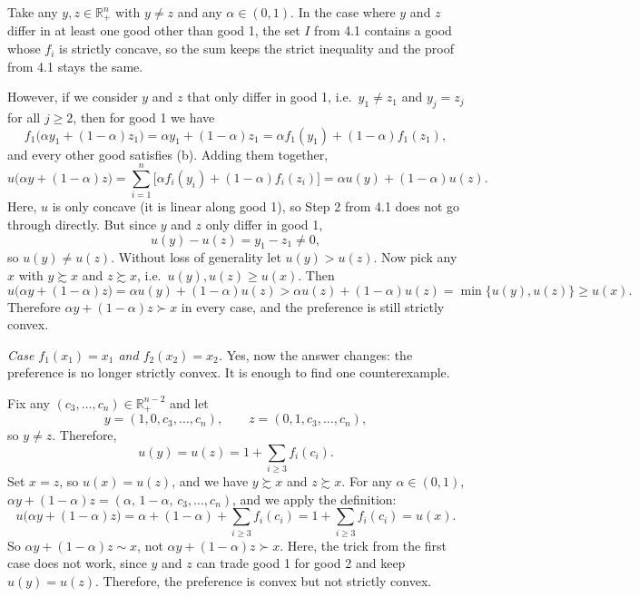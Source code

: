 \documentclass[12pt,letterpaper]{article}
\begin{document}
Take any $y,z\in\mathbb{R}^n_+$ with $y\neq z$ and any $\alpha\in(0,1)$. In the case where $y$ and $z$ differ in at least one good other than good 1, the set $I$ from 4.1 contains a good whose $f_i$ is strictly concave, so the sum keeps the strict inequality and the proof from 4.1 stays the same.

However, if we consider $y$ and $z$ that only differ in good 1, i.e.\ $y_1\neq z_1$ and $y_j=z_j$ for all $j\ge 2$, then for good 1 we have
\[
f_1\big(\alpha y_1+(1-\alpha)z_1\big) = \alpha y_1+(1-\alpha)z_1 = \alpha f_1(y_1)+(1-\alpha)f_1(z_1),
\]
and every other good satisfies (b). Adding them together,
\[
u\big(\alpha y+(1-\alpha)z\big) = \sum_{i=1}^n \Big[\alpha f_i(y_i)+(1-\alpha)f_i(z_i)\Big] = \alpha u(y)+(1-\alpha)u(z).
\]
Here, $u$ is only concave (it is linear along good 1), so Step 2 from 4.1 does not go through directly. But since $y$ and $z$ only differ in good 1,
\[
u(y)-u(z) = y_1-z_1 \neq 0,
\]
so $u(y)\neq u(z)$. Without loss of generality let $u(y)>u(z)$. Now pick any $x$ with $y\succsim x$ and $z\succsim x$, i.e.\ $u(y),u(z)\ge u(x)$. Then
\[
u\big(\alpha y+(1-\alpha)z\big) = \alpha u(y)+(1-\alpha)u(z) > \alpha u(z)+(1-\alpha)u(z) = \min\{u(y),u(z)\} \ge u(x).
\]
Therefore $\alpha y+(1-\alpha)z\succ x$ in every case, and the preference is still strictly convex.


\textit{Case $f_1(x_1)=x_1$ and $f_2(x_2)=x_2$.} Yes, now the answer changes: the preference is no longer strictly convex. It is enough to find one counterexample.

Fix any $(c_3,\dots,c_n)\in\mathbb{R}^{n-2}_+$ and let
\[
y=(1,0,c_3,\dots,c_n), \qquad z=(0,1,c_3,\dots,c_n),
\]
so $y\neq z$. Therefore,
\[
u(y)=u(z)=1+\sum_{i\ge 3} f_i(c_i).
\]
Set $x=z$, so $u(x)=u(z)$, and we have $y\succsim x$ and $z\succsim x$. For any $\alpha\in(0,1)$, $\alpha y+(1-\alpha)z=(\alpha,\,1-\alpha,\,c_3,\dots,c_n)$, and we apply the definition:
\[
u\big(\alpha y+(1-\alpha)z\big) = \alpha+(1-\alpha)+\sum_{i\ge 3} f_i(c_i) = 1+\sum_{i\ge 3} f_i(c_i) = u(x).
\]
So $\alpha y+(1-\alpha)z\sim x$, not $\alpha y+(1-\alpha)z\succ x$. Here, the trick from the first case does not work, since $y$ and $z$ can trade good 1 for good 2 and keep $u(y)=u(z)$. Therefore, the preference is convex but not strictly convex.
\end{document}
